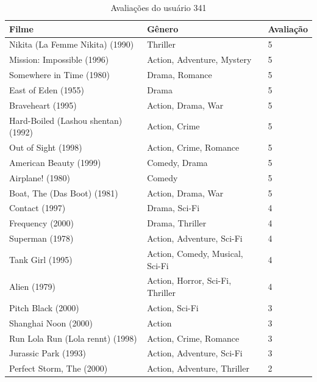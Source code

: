 \documentclass[12pt,a4paper,header]{abnt}
\begin{document}
\begin{longtable}{@{}lll@{}}
\caption{Avaliações do usuário 341}
\label{user_rating}\\
\toprule
\textbf{Filme}                      & \textbf{Gênero}               & \textbf{Avaliação} \\* \midrule
\endhead
%
\bottomrule
\endfoot
%
\endlastfoot
%
Nikita (La Femme Nikita) (1990)     & Thriller                      & 5                  \\
Mission: Impossible (1996)          & Action, Adventure, Mystery      & 5                  \\
Somewhere in Time (1980)            & Drama, Romance                 & 5                  \\
East of Eden (1955)                 & Drama                         & 5                  \\
Braveheart (1995)                   & Action, Drama, War              & 5                  \\
Hard-Boiled (Lashou shentan) (1992) & Action, Crime                  & 5                  \\
Out of Sight (1998)                 & Action, Crime, Romance          & 5                  \\
American Beauty (1999)              & Comedy, Drama                  & 5                  \\
Airplane! (1980)                    & Comedy                        & 5                  \\
Boat, The (Das Boot) (1981)         & Action, Drama, War              & 5                  \\
Contact (1997)                      & Drama, Sci-Fi                  & 4                  \\
Frequency (2000)                    & Drama, Thriller                & 4                  \\
Superman (1978)                     & Action, Adventure, Sci-Fi       & 4                  \\
Tank Girl (1995)                    & Action, Comedy, Musical, Sci-Fi  & 4                  \\
Alien (1979)                        & Action, Horror, Sci-Fi, Thriller & 4                  \\
Pitch Black (2000)                  & Action, Sci-Fi                 & 3                  \\
Shanghai Noon (2000)                & Action                        & 3                  \\
Run Lola Run (Lola rennt) (1998)    & Action, Crime, Romance          & 3                  \\
Jurassic Park (1993)                & Action, Adventure, Sci-Fi       & 3                  \\
Perfect Storm, The (2000)           & Action, Adventure, Thriller     & 2                  \\* \bottomrule
\end{longtable}
\end{document}
